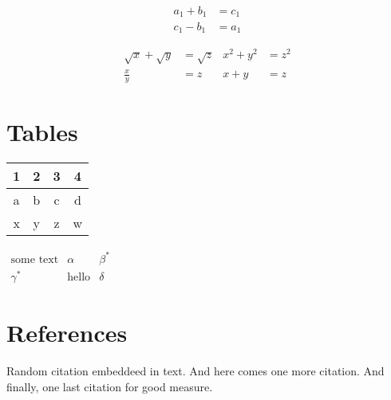 \documentclass[a4paper,12pt]{article}
\begin{document}
\begin{align*}
    a_1 + b_1 &= c_1 \\
    c_1 - b_1 &= a_1
\end{align*}

\begin{align*}
    \sqrt{x}+\sqrt{y}&=\sqrt{z} & x^2+y^2&=z^2 \\
    \frac{x}{y}&=z & x+y&=z
\end{align*}

\section{Tables}

\begin{tabular}{|c|c|c|c|}
\hline 1 & 2 & 3 & 4 \\
\hline a & b & c & d \\
\hline x & y & z & w \\
\hline
\end{tabular} 

$
\begin{matrix}
    \text{some text} & \alpha& \beta^{*}\\
    \gamma^{*} & \text{hello} & \delta
\end{matrix}
$

\section{References}

Random citation \cite{knuthwebsite} embeddeed in text. And here
comes one more \cite{latexcompanion} citation. And finally, one
last \cite{einstein} citation for good measure.

 

\end{document}
